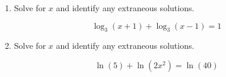 \documentclass[11pt]{article}
\begin{document}
\begin{enumerate}
{{extraneous solutions: \(\boxed{ \text{none} }\)

}
}

\newpage

% 

\item %
\providecommand{\stxKnowl}{}\renewcommand{\stxKnowl}[1]{#1}
\providecommand{\stxOuttro}{}\renewcommand{\stxOuttro}[1]{#1}
\providecommand{\stxTitle}{}\renewcommand{\stxTitle}[1]{#1}
\renewcommand{\stxOuttro}[1]{}
\stxKnowl{
Solve for \(x\) and identify any extraneous solutions.

\[\log_{3}(x + 1) + \log_{3}(x - 1) = 1\]

\stxOuttro{
Solution

\[\begin{aligned} \log_{3}((x + 1)(x - 1)) &= 1 \\ 3 &= (x + 1)(x - 1) \\ 3 &= x^{2} - 1 \\ 0 &= x^{2} - 4 \\ 0 &= (x - 2)(x + 2) \end{aligned}\]

 \(x = 2\) is a valid solution, while \(x = -2\) causes a non-positive argument in the original logarithms. 

solutions: \(\boxed{ x = 2 }\)

extraneous solutions: \(\boxed{ x = -2 }\)

}
}

\newpage

% 

\item %
\providecommand{\stxKnowl}{}\renewcommand{\stxKnowl}[1]{#1}
\providecommand{\stxOuttro}{}\renewcommand{\stxOuttro}[1]{#1}
\providecommand{\stxTitle}{}\renewcommand{\stxTitle}[1]{#1}
\renewcommand{\stxOuttro}[1]{}
\stxKnowl{
Solve for \(x\) and identify any extraneous solutions.

\[\ln(5) + \ln(2x^2) = \ln(40)\]

\stxOuttro{
Solution

\[\begin{aligned} \ln(5 \cdot 2x^2) &= \ln(40) \\ 10x^2 &= 40 \\ x^2 &= 4 \\ x &= \pm 2 \end{aligned}\]

}}
\end{enumerate}
\end{document}
